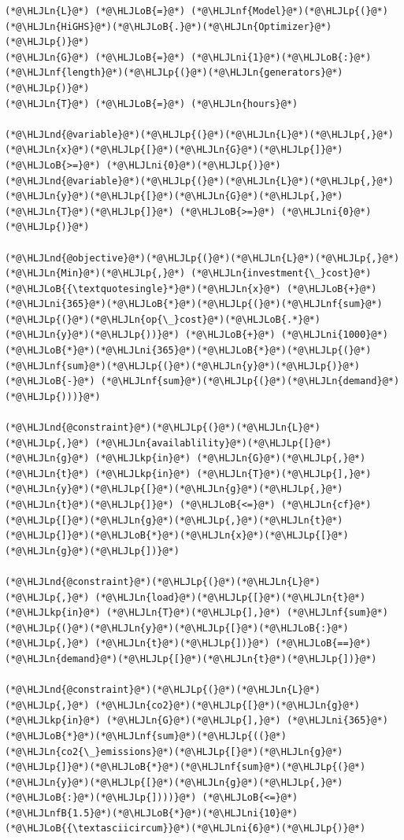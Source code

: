 \documentclass[12pt,a4paper]{article}
\newcommand{\HLJLkp}[1]{\textcolor[RGB]{148,91,176}{\textbf{#1}}}
\newcommand{\HLJLn}[1]{#1}
\newcommand{\HLJLnd}[1]{\textcolor[RGB]{214,102,97}{#1}}
\newcommand{\HLJLnf}[1]{\textcolor[RGB]{66,102,213}{#1}}
\newcommand{\HLJLnfB}[1]{\textcolor[RGB]{59,151,46}{#1}}
\newcommand{\HLJLni}[1]{\textcolor[RGB]{59,151,46}{#1}}
\newcommand{\HLJLoB}[1]{\textcolor[RGB]{102,102,102}{\textbf{#1}}}
\newcommand{\HLJLp}[1]{#1}
\begin{document}
\begin{lstlisting}
(*@\HLJLn{L}@*) (*@\HLJLoB{=}@*) (*@\HLJLnf{Model}@*)(*@\HLJLp{(}@*)(*@\HLJLn{HiGHS}@*)(*@\HLJLoB{.}@*)(*@\HLJLn{Optimizer}@*)(*@\HLJLp{)}@*)
(*@\HLJLn{G}@*) (*@\HLJLoB{=}@*) (*@\HLJLni{1}@*)(*@\HLJLoB{:}@*)(*@\HLJLnf{length}@*)(*@\HLJLp{(}@*)(*@\HLJLn{generators}@*)(*@\HLJLp{)}@*)
(*@\HLJLn{T}@*) (*@\HLJLoB{=}@*) (*@\HLJLn{hours}@*)

(*@\HLJLnd{@variable}@*)(*@\HLJLp{(}@*)(*@\HLJLn{L}@*)(*@\HLJLp{,}@*) (*@\HLJLn{x}@*)(*@\HLJLp{[}@*)(*@\HLJLn{G}@*)(*@\HLJLp{]}@*) (*@\HLJLoB{>=}@*) (*@\HLJLni{0}@*)(*@\HLJLp{)}@*)
(*@\HLJLnd{@variable}@*)(*@\HLJLp{(}@*)(*@\HLJLn{L}@*)(*@\HLJLp{,}@*) (*@\HLJLn{y}@*)(*@\HLJLp{[}@*)(*@\HLJLn{G}@*)(*@\HLJLp{,}@*) (*@\HLJLn{T}@*)(*@\HLJLp{]}@*) (*@\HLJLoB{>=}@*) (*@\HLJLni{0}@*)(*@\HLJLp{)}@*)

(*@\HLJLnd{@objective}@*)(*@\HLJLp{(}@*)(*@\HLJLn{L}@*)(*@\HLJLp{,}@*) (*@\HLJLn{Min}@*)(*@\HLJLp{,}@*) (*@\HLJLn{investment{\_}cost}@*)(*@\HLJLoB{{\textquotesingle}*}@*)(*@\HLJLn{x}@*) (*@\HLJLoB{+}@*) (*@\HLJLni{365}@*)(*@\HLJLoB{*}@*)(*@\HLJLp{(}@*)(*@\HLJLnf{sum}@*)(*@\HLJLp{(}@*)(*@\HLJLn{op{\_}cost}@*)(*@\HLJLoB{.*}@*)(*@\HLJLn{y}@*)(*@\HLJLp{))}@*) (*@\HLJLoB{+}@*) (*@\HLJLni{1000}@*)(*@\HLJLoB{*}@*)(*@\HLJLni{365}@*)(*@\HLJLoB{*}@*)(*@\HLJLp{(}@*)(*@\HLJLnf{sum}@*)(*@\HLJLp{(}@*)(*@\HLJLn{y}@*)(*@\HLJLp{)}@*) (*@\HLJLoB{-}@*) (*@\HLJLnf{sum}@*)(*@\HLJLp{(}@*)(*@\HLJLn{demand}@*)(*@\HLJLp{)))}@*)

(*@\HLJLnd{@constraint}@*)(*@\HLJLp{(}@*)(*@\HLJLn{L}@*)(*@\HLJLp{,}@*) (*@\HLJLn{availablility}@*)(*@\HLJLp{[}@*)(*@\HLJLn{g}@*) (*@\HLJLkp{in}@*) (*@\HLJLn{G}@*)(*@\HLJLp{,}@*) (*@\HLJLn{t}@*) (*@\HLJLkp{in}@*) (*@\HLJLn{T}@*)(*@\HLJLp{],}@*) (*@\HLJLn{y}@*)(*@\HLJLp{[}@*)(*@\HLJLn{g}@*)(*@\HLJLp{,}@*)(*@\HLJLn{t}@*)(*@\HLJLp{]}@*) (*@\HLJLoB{<=}@*) (*@\HLJLn{cf}@*)(*@\HLJLp{[}@*)(*@\HLJLn{g}@*)(*@\HLJLp{,}@*)(*@\HLJLn{t}@*)(*@\HLJLp{]}@*)(*@\HLJLoB{*}@*)(*@\HLJLn{x}@*)(*@\HLJLp{[}@*)(*@\HLJLn{g}@*)(*@\HLJLp{])}@*)

(*@\HLJLnd{@constraint}@*)(*@\HLJLp{(}@*)(*@\HLJLn{L}@*)(*@\HLJLp{,}@*) (*@\HLJLn{load}@*)(*@\HLJLp{[}@*)(*@\HLJLn{t}@*) (*@\HLJLkp{in}@*) (*@\HLJLn{T}@*)(*@\HLJLp{],}@*) (*@\HLJLnf{sum}@*)(*@\HLJLp{(}@*)(*@\HLJLn{y}@*)(*@\HLJLp{[}@*)(*@\HLJLoB{:}@*)(*@\HLJLp{,}@*) (*@\HLJLn{t}@*)(*@\HLJLp{])}@*) (*@\HLJLoB{==}@*) (*@\HLJLn{demand}@*)(*@\HLJLp{[}@*)(*@\HLJLn{t}@*)(*@\HLJLp{])}@*)

(*@\HLJLnd{@constraint}@*)(*@\HLJLp{(}@*)(*@\HLJLn{L}@*)(*@\HLJLp{,}@*) (*@\HLJLn{co2}@*)(*@\HLJLp{[}@*)(*@\HLJLn{g}@*) (*@\HLJLkp{in}@*) (*@\HLJLn{G}@*)(*@\HLJLp{],}@*) (*@\HLJLni{365}@*)(*@\HLJLoB{*}@*)(*@\HLJLnf{sum}@*)(*@\HLJLp{((}@*)(*@\HLJLn{co2{\_}emissions}@*)(*@\HLJLp{[}@*)(*@\HLJLn{g}@*)(*@\HLJLp{]}@*)(*@\HLJLoB{*}@*)(*@\HLJLnf{sum}@*)(*@\HLJLp{(}@*)(*@\HLJLn{y}@*)(*@\HLJLp{[}@*)(*@\HLJLn{g}@*)(*@\HLJLp{,}@*)(*@\HLJLoB{:}@*)(*@\HLJLp{])))}@*) (*@\HLJLoB{<=}@*) (*@\HLJLnfB{1.5}@*)(*@\HLJLoB{*}@*)(*@\HLJLni{10}@*)(*@\HLJLoB{{\textasciicircum}}@*)(*@\HLJLni{6}@*)(*@\HLJLp{)}@*)
\end{lstlisting}
\end{document}

